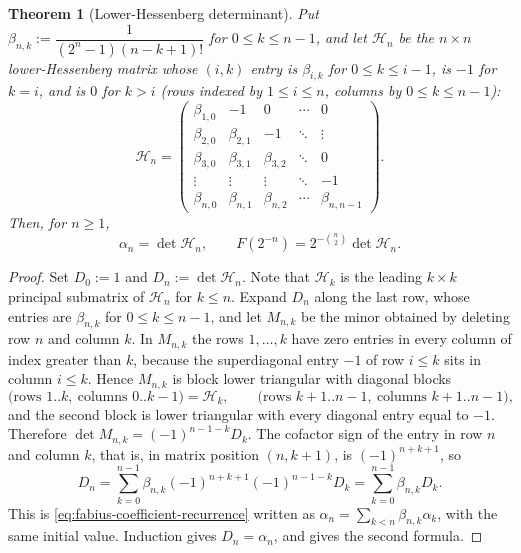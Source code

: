 \documentclass[11pt,oneside,openany]{book}
\newtheorem{theorem}{Theorem}[chapter]
\theoremstyle{definition}
\theoremstyle{remark}
\begin{document}
\begin{theorem}[Lower-Hessenberg determinant]\label{thm:fabius-hessenberg}
Put $\beta_{n,k}:=\dfrac1{(2^n-1)(n-k+1)!}$ for $0\le k\le n-1$, and let
$\mathcal H_n$ be the $n\times n$ lower-Hessenberg matrix whose $(i,k)$ entry is
$\beta_{i,k}$ for $0\le k\le i-1$, is $-1$ for $k=i$, and is $0$ for $k>i$
(rows indexed by $1\le i\le n$, columns by $0\le k\le n-1$):
\begin{equation}\label{eq:fabius-hessenberg-matrix}
 \mathcal H_n=
 \begin{pmatrix}
 \beta_{1,0}&-1&0&\cdots&0\\
 \beta_{2,0}&\beta_{2,1}&-1&\ddots&\vdots\\
 \beta_{3,0}&\beta_{3,1}&\beta_{3,2}&\ddots&0\\
 \vdots&\vdots&\vdots&\ddots&-1\\
 \beta_{n,0}&\beta_{n,1}&\beta_{n,2}&\cdots&\beta_{n,n-1}
 \end{pmatrix}.
\end{equation}
Then, for $n\ge1$,
\begin{equation}\label{eq:fabius-hessenberg}
 \alpha_n=\det\mathcal H_n,
 \qquad
 F(2^{-n})=2^{-\binom n2}\det\mathcal H_n .
\end{equation}
\end{theorem}

\begin{proof}
Set $D_0:=1$ and $D_n:=\det\mathcal H_n$.  Note that $\mathcal H_k$ is the leading
$k\times k$ principal submatrix of $\mathcal H_n$ for $k\le n$.  Expand $D_n$ along the
last row, whose entries are $\beta_{n,k}$ for $0\le k\le n-1$, and let $M_{n,k}$ be the
minor obtained by deleting row $n$ and column $k$.  In $M_{n,k}$ the rows $1,\ldots,k$
have zero entries in every column of index greater than $k$, because the superdiagonal
entry $-1$ of row $i\le k$ sits in column $i\le k$.  Hence $M_{n,k}$ is block lower
triangular with diagonal blocks
\[
 \bigl(\text{rows }1..k,\ \text{columns }0..k-1\bigr)=\mathcal H_k,
 \qquad
 \bigl(\text{rows }k{+}1..n{-}1,\ \text{columns }k{+}1..n{-}1\bigr),
\]
and the second block is lower triangular with every diagonal entry equal to $-1$.
Therefore $\det M_{n,k}=(-1)^{n-1-k}D_k$.  The cofactor sign of the entry in row $n$ and
column $k$, that is, in matrix position $(n,k+1)$, is $(-1)^{n+k+1}$, so
\[
 D_n=\sum_{k=0}^{n-1}\beta_{n,k}(-1)^{n+k+1}(-1)^{n-1-k}D_k
 =\sum_{k=0}^{n-1}\beta_{n,k}D_k .
\]
This is \eqref{eq:fabius-coefficient-recurrence} written as
$\alpha_n=\sum_{k<n}\beta_{n,k}\alpha_k$, with the same initial value.  Induction gives
$D_n=\alpha_n$, and  gives the second formula.
\end{proof}
\end{document}
